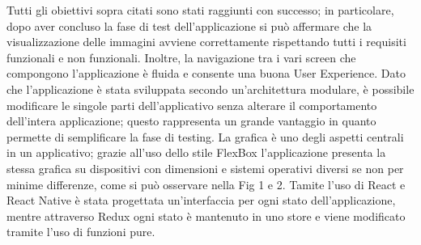 \documentclass[a4paper,11pt]{article}
\begin{document}
Tutti gli obiettivi sopra citati sono stati raggiunti con successo; in particolare, dopo aver concluso la fase di test dell'applicazione si pu\`o affermare che la visualizzazione delle immagini avviene correttamente rispettando tutti i requisiti funzionali e non funzionali.
Inoltre, la navigazione tra i vari screen che compongono l'applicazione \`e fluida e consente una buona User Experience.
Dato che l'applicazione \`e stata sviluppata secondo un'architettura modulare, \`e possibile modificare le singole parti dell'applicativo senza alterare il comportamento dell'intera applicazione; questo rappresenta un grande vantaggio in quanto permette di semplificare la fase di testing.
La grafica \`e uno degli aspetti centrali in un applicativo; grazie all'uso dello stile FlexBox l'applicazione presenta la stessa grafica su dispositivi con dimensioni e sistemi operativi diversi se non per minime differenze, come si può osservare nella Fig 1 e 2.
Tamite l'uso di React e React Native \`e stata progettata un'interfaccia per ogni stato dell'applicazione, mentre attraverso Redux ogni stato \`e mantenuto in uno store e viene modificato tramite l'uso di funzioni pure.
\end{document}
